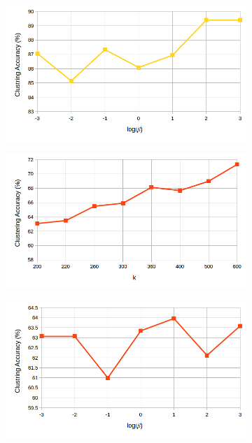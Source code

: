 \begin{figure}[!h]
\begin{subfigure}[b]{0.43\linewidth}
  \end{subfigure}
    \begin{subfigure}[b]{0.43\linewidth}
    \includegraphics[width=\linewidth]{images/cluster_beta}
  \end{subfigure}
    \begin{subfigure}[b]{0.43\linewidth}
    \includegraphics[width=\linewidth]{images/cluster_k_birds}
  \end{subfigure}
    \begin{subfigure}[b]{0.43\linewidth}
    \includegraphics[width=\linewidth]{images/cluster_beta_birds}

\end{subfigure}
\end{figure}
